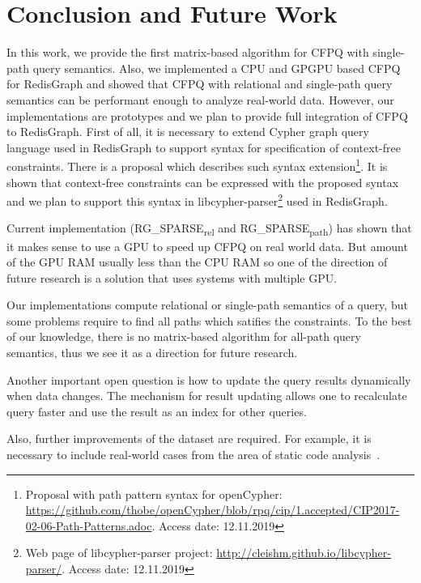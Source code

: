 \section{Conclusion and Future Work}
In this work, we provide the first matrix-based algorithm for CFPQ with single-path query semantics.
Also, we implemented a CPU and GPGPU based CFPQ for RedisGraph and showed that CFPQ with relational and single-path query semantics can be performant enough to analyze real-world data.
However, our implementations are prototypes and we plan to provide full integration of CFPQ to RedisGraph.
First of all, it is necessary to extend Cypher graph query language used in RedisGraph to support syntax for specification of context-free constraints.
There is a proposal which describes such syntax extension\footnote{Proposal with path pattern syntax for openCypher: \url{https://github.com/thobe/openCypher/blob/rpq/cip/1.accepted/CIP2017-02-06-Path-Patterns.adoc}. Access date: 12.11.2019}. It is shown that context-free constraints can be expressed with the proposed syntax and we plan to support this syntax in libcypher-parser\footnote{Web page of libcypher-parser project: \url{http://cleishm.github.io/libcypher-parser/}. Access date: 12.11.2019} used in RedisGraph.

Current implementation (RG\_SPARSE\textsubscript{rel} and RG\_SPARSE\textsubscript{path}) has shown that it makes sense to use a GPU to speed up CFPQ on real world data. But amount of the GPU RAM usually less than the CPU RAM so one of the direction of future research is a solution that uses systems with multiple GPU.

Our implementations compute relational or single-path semantics of a query, but some problems require to find all paths which satifies the constraints.
To the best of our knowledge, there is no matrix-based algorithm for all-path query semantics, thus we see it as a direction for future research.

Another important open question is how to update the query results dynamically when data changes.
The mechanism for result updating allows one to recalculate query faster and use the result as an index for other queries.

Also, further improvements of the dataset are required.
For example, it is necessary to include real-world cases from the area of static code analysis~\cite{Zheng:2008:DAA:1328897.1328464,veduradabatch,LPAR-21:Cauliflower_Solver_Generator_for}.
